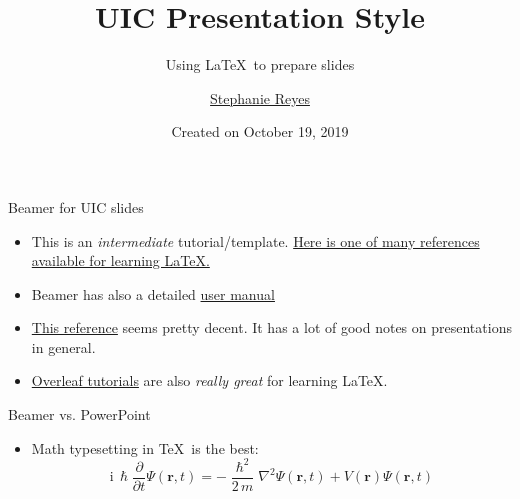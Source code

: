 \documentclass{uic-beamer}
\title{UIC Presentation Style}
\subtitle{Using \LaTeX\ to prepare slides}
\author{\href{mailto:stephanie@math.uic.edu}{Stephanie Reyes}}
\date{Created on October 19, 2019}
\newcommand{\hrefcol}[2]{\textcolor{cyan}{\href{#1}{#2}}}
\begin{document}
\maketitle

\begin{frame}{Beamer for UIC slides}
\begin{itemize}
\item This is an \emph{intermediate} tutorial/template. 
\hrefcol{http://en.wikibooks.org/wiki/LaTeX/}{Here is one of many references available for learning LaTeX.}
\item Beamer has also a detailed
\hrefcol{http://www.ctan.org/tex-archive/macros/latex/contrib/beamer/doc/beameruserguide.pdf}{user manual}
\item \hrefcol{http://tug.ctan.org/macros/latex/contrib/beamer/doc/beameruserguide.pdf}{This reference} seems pretty decent. It has a lot of good notes on presentations in general.
\item \hrefcol{https://www.overleaf.com/learn/latex/Beamer}{Overleaf tutorials} are also \emph{really great} for learning \LaTeX.
\end{itemize}
\end{frame}

\begin{frame}{Beamer vs. PowerPoint}
\begin{itemize}
\item Math typesetting in \TeX\ is the best:
\begin{equation*}
\mathrm{i}\,\hslash\frac{\partial}{\partial t} \Psi(\mathbf{r},t) =
-\frac{\hslash^2}{2\,m}\nabla^2\Psi(\mathbf{r},t)
+ V(\mathbf{r})\Psi(\mathbf{r},t)
\end{equation*}

\end{itemize}
\end{frame}

\end{document}
